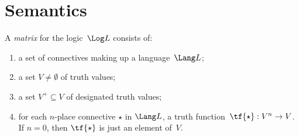 \documentclass[../../../../include/open-logic-chapter]{subfiles}
\begin{document}

\section{Semantics}

\begin{defn}[Matrix]
A \emph{matrix} for the logic~$\Log L$ consists of:
\begin{enumerate}
\item a set of connectives making up a language~$\Lang L$;
\item a set $V \neq \emptyset$ of truth values;
\item a set $V^+ \subseteq V$ of designated truth values;
\item for each $n$-place connective $\star$ in $\Lang L$, a truth
function~$\tf{\star} : V^n \to V$. If $n = 0$, then $\tf{\star}$ is
just an element of~$V$.
\end{enumerate}
\end{defn}
\end{document}

